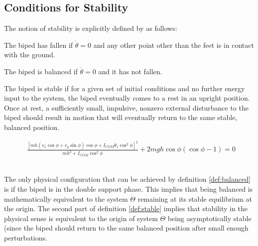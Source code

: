 \subsection{Conditions for Stability}
The notion of stability is explicitly defined by \cite{Wight:2008vt} as follows: 

\hrulefill

\begin{definition} \label{def:fallen}
	The biped has fallen if $\dot{\theta} = 0$ and any other point other than the feet is in contact with the ground. 
\end{definition}

\begin{definition} \label{def:balanced}
	The biped is balanced if $\dot{\theta} = 0$ and it has not fallen. 
\end{definition}

\begin{definition} \label{def:stable}
	The biped is stable if for a given set of initial conditions and no further energy input to the system, the biped eventually comes to a rest in an upright position. Once at rest, a sufficiently small, impulsive, nonzero external disturbance to the biped should result in motion that will eventually return to the same stable, balanced position. 
\end{definition}

\hrulefill

\begin{figure}[!t]
	\begin{equation} \label{eq:fpe}
	\begin{aligned}
		\frac{{{{\left[ {mh({v_x}\cos \phi  + {v_y}\sin \phi )\cos \phi  + {I_{COM}}{{\dot \theta }_1}{{\cos }^2}\phi } \right]}^2}}}{{m{h^2} + {I_{COM}}{{\cos }^2}\phi }} + 2mgh\cos \phi (\cos \phi  - 1) = 0
	\end{aligned}
	\end{equation}
	\\ 
	\hrulefill
\end{figure}

The only physical configuration that can be achieved by definition \ref{def:balanced} is if the biped is in the double support phase. This implies that being balanced is mathematically equivalent to the system $\dot{\Theta}$ remaining at its stable equilibrium at the origin. The second part of definition \ref{def:stable} implies that stability in the physical sense is equivalent to the origin of system $\dot{\Theta}$ being asymptotically stable (since the biped should return to the same balanced position after small enough perturbations.


